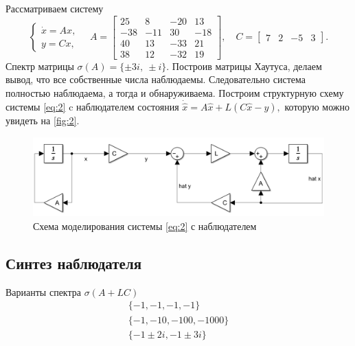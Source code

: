 Рассматриваем систему
\begin{equation}
    \begin{cases}
        \dot x = Ax,\\
        y = Cx,
    \end{cases}\quad
    A=\begin{bmatrix}
        25& 8& -20& 13\\
        -38& -11& 30& -18\\
        40& 13& -33& 21\\
        38& 12& -32& 19
    \end{bmatrix},\quad
    C=\begin{bmatrix}
        7&2&-5&3
    \end{bmatrix}.
    \label{eq:2}
\end{equation}
Спектр матрицы $\sigma(A)= \{\pm3i,\ \pm i\}.$ Построив матрицы Хаутуса, 
делаем вывод, что все собственные числа наблюдаемы. Следовательно
система полностью наблюдаема, а тогда и обнаруживаема.
Построим структурную схему системы \ref{eq:2} c наблюдателем состояния
$\dot{\hat x}=A\hat x+L(C\hat x - y),$ которую можно увидеть на \autoref{fig:2}.

\begin{figure}[H]
    \centering
    \includegraphics[width=\linewidth]{figs/task2_slx.png}
    \caption{Схема моделирования системы \ref{eq:2} с наблюдателем}
    \label{fig:2}
\end{figure}

\subsection{Синтез наблюдателя}

Варианты спектра $\sigma(A+LC)$
\begin{equation*}
    \begin{array}{c}
        \{-1, -1, -1, -1\}\\
        \{-1, -10, -100, -1000\}\\
        \{-1 \pm 2i, -1 \pm 3i\}
    \end{array}
\end{equation*}


